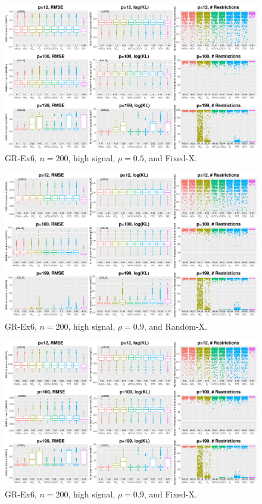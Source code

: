 \begin{figure}[!ht]
\centering
\includegraphics[width=\textwidth]{figures/supplement/fixedx_GR-Ex6_n200_hsnr_rho05.eps}
\caption{GR-Ex6, $n=200$, high signal, $\rho=0.5$, and Fixed-X.}
\end{figure}
\clearpage
\begin{figure}[!ht]
\centering
\includegraphics[width=\textwidth]{figures/supplement/randomx_GR-Ex6_n200_hsnr_rho09.eps}
\caption{GR-Ex6, $n=200$, high signal, $\rho=0.9$, and Random-X.}
\end{figure}
\begin{figure}[!ht]
\centering
\includegraphics[width=\textwidth]{figures/supplement/fixedx_GR-Ex6_n200_hsnr_rho09.eps}
\caption{GR-Ex6, $n=200$, high signal, $\rho=0.9$, and Fixed-X.}
\end{figure}

